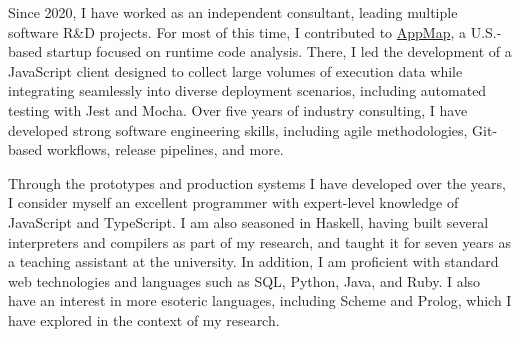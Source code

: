 \documentclass[a4paper,11pt,english]{article}
\newcommand{\ImplicitLink}[2]{\href{#1}{\textcolor{MarkerColour!80!black}{#2}}}
\begin{document}
\vspace{12pt}

Since 2020, I have worked as an independent consultant, leading multiple software R\&D projects. For most of this time, I contributed to \ImplicitLink{https://appmap.io}{AppMap}, a U.S.-based startup focused on runtime code analysis. There, I led the development of a JavaScript client designed to collect large volumes of execution data while integrating seamlessly into diverse deployment scenarios, including automated testing with Jest and Mocha. Over five years of industry consulting, I have developed strong software engineering skills, including agile methodologies, Git-based workflows, release pipelines, and more.

\vspace{12pt}

Through the prototypes and production systems I have developed over the years, I consider myself an excellent programmer with expert-level knowledge of JavaScript and TypeScript. I am also seasoned in Haskell, having built several interpreters and compilers as part of my research, and taught it for seven years as a teaching assistant at the university. In addition, I am proficient with standard web technologies and languages such as SQL, Python, Java, and Ruby. I also have an interest in more esoteric languages, including Scheme and Prolog, which I have explored in the context of my research.
\end{document}
